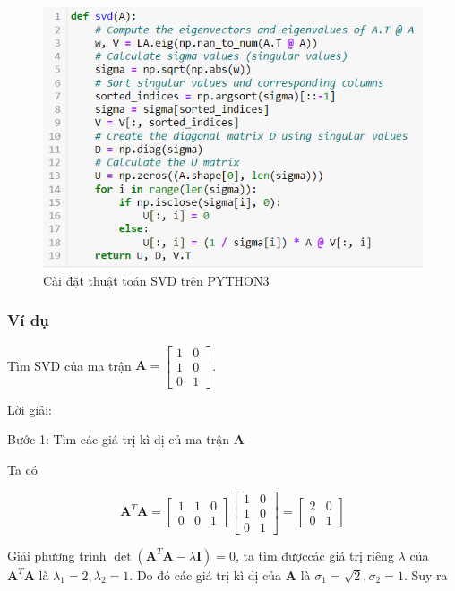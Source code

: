 \documentclass[12pt,a4paper,oneside]{report}
\numberwithin{equation}{section}
\begin{document}
\begin{figure}[htp]
	\centering
	\includegraphics[scale=0.9]{implement_svd.png}
	\caption{Cài đặt thuật toán SVD trên PYTHON3}
	\label{fig:svd_algo}
\end{figure}

\subsubsection{Ví dụ}

Tìm SVD của ma trận $\mathbf{A}=\left[\begin{array}{ll}1 & 0 \\ 1 & 0 \\ 0 & 1\end{array}\right]$.

Lời giải:

Bước 1: Tìm các giá trị kì dị củ ma trận $\mathbf{A}$

Ta có

$$
\mathbf{A}^{T} \mathbf{A}=\left[\begin{array}{lll}
	1 & 1 & 0 \\
	0 & 0 & 1
\end{array}\right]\left[\begin{array}{ll}
	1 & 0 \\
	1 & 0 \\
	0 & 1
\end{array}\right]=\left[\begin{array}{ll}
	2 & 0 \\
	0 & 1
\end{array}\right]
$$

Giải phương trình $\operatorname{det}\left(\mathbf{A}^{T} \mathbf{A}-\lambda \mathbf{I}\right)=0$, ta tìm đượccác giá trị riêng $\lambda$ của $\mathbf{A}^{T} \mathbf{A}$ là $\lambda_{1}=2, \lambda_{2}=1$. Do đó các giá trị kì dị của $\mathbf{A}$ là $\sigma_{1}=\sqrt{2}, \sigma_{2}=1$. Suy ra
\end{document}
